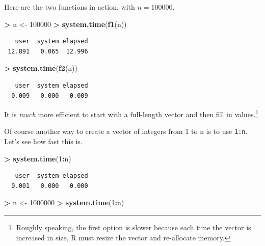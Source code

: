 \documentclass[
]{krantz}
\makeatletter
\newenvironment{Shaded}{\begin{snugshade}}{\end{snugshade}}
\newcommand{\DecValTok}[1]{\textcolor[rgb]{0.06,0.06,0.06}{#1}}
\newcommand{\KeywordTok}[1]{\textcolor[rgb]{0.27,0.27,0.27}{\textbf{#1}}}
\newcommand{\NormalTok}[1]{#1}
\newcommand{\OperatorTok}[1]{\textcolor[rgb]{0.43,0.43,0.43}{\textbf{#1}}}
\newcommand{\StringTok}[1]{\textcolor[rgb]{0.5,0.5,0.5}{#1}}
\newenvironment{kframe}{%
\medskip{}
\setlength{\fboxsep}{.8em}
 \def\at@end@of@kframe{}%
 \ifinner\ifhmode%
  \def\at@end@of@kframe{\end{minipage}}%
  \begin{minipage}{\columnwidth}%
 \fi\fi%
 \def\FrameCommand##1{\hskip\@totalleftmargin \hskip-\fboxsep
 \colorbox{shadecolor}{##1}\hskip-\fboxsep
     \hskip-\linewidth \hskip-\@totalleftmargin \hskip\columnwidth}%
 \MakeFramed {\advance\hsize-\width
   \@totalleftmargin\z@ \linewidth\hsize
   \@setminipage}}%
 {\par\unskip\endMakeFramed%
 \at@end@of@kframe}
\renewenvironment{Shaded}{\begin{kframe}}{\end{kframe}}
\makeatother
\begin{document}
Here are the two functions in action, with \(n = 100000\).

\begin{Shaded}
\begin{Highlighting}[]
\OperatorTok{\textgreater{}}\StringTok{ }\NormalTok{n \textless{}{-}}\StringTok{ }\DecValTok{100000}
\OperatorTok{\textgreater{}}\StringTok{ }\KeywordTok{system.time}\NormalTok{(}\KeywordTok{f1}\NormalTok{(n))}
\end{Highlighting}
\end{Shaded}

\begin{verbatim}
   user  system elapsed 
 12.891   0.065  12.996 
\end{verbatim}

\begin{Shaded}
\begin{Highlighting}[]
\OperatorTok{\textgreater{}}\StringTok{ }\KeywordTok{system.time}\NormalTok{(}\KeywordTok{f2}\NormalTok{(n))}
\end{Highlighting}
\end{Shaded}

\begin{verbatim}
   user  system elapsed 
  0.009   0.000   0.009 
\end{verbatim}

It is \emph{much} more efficient to start with a full-length vector and then fill in values.\footnote{Roughly speaking, the first option is slower because each time the vector is increased in size, R must resize the vector and re-allocate memory.}

Of course another way to create a vector of integers from 1 to n is to use \texttt{1:n}. Let's see how fast this is.

\begin{Shaded}
\begin{Highlighting}[]
\OperatorTok{\textgreater{}}\StringTok{ }\KeywordTok{system.time}\NormalTok{(}\DecValTok{1}\OperatorTok{:}\NormalTok{n)}
\end{Highlighting}
\end{Shaded}

\begin{verbatim}
   user  system elapsed 
  0.001   0.000   0.000 
\end{verbatim}

\begin{Shaded}
\begin{Highlighting}[]
\OperatorTok{\textgreater{}}\StringTok{ }\NormalTok{n \textless{}{-}}\StringTok{ }\DecValTok{1000000}
\OperatorTok{\textgreater{}}\StringTok{ }\KeywordTok{system.time}\NormalTok{(}\DecValTok{1}\OperatorTok{:}\NormalTok{n)      }
\end{Highlighting}
\end{Shaded}
\end{document}
